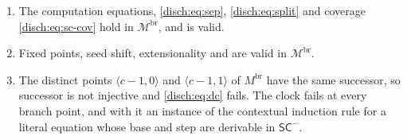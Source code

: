 \begin{lemma}
\label{disch:lem:sc-branch-valid}
\begin{enumerate}[label=\textup{(\alph*)}]
\item The computation equations, \eqref{disch:eq:sep}, \eqref{disch:eq:split}
 and coverage \eqref{disch:eq:sc-cov} hold in $\mathcal M^{\mathrm{br}}$,
 and  is valid.
\item Fixed points, seed shift, extensionality and  are
 valid in $\mathcal M^{\mathrm{br}}$.
\item The distinct points $\langle c-1,0\rangle$ and $\langle c-1,1\rangle$
 of $M^{\mathrm{br}}$ have the same successor, so successor is not injective
 and \eqref{disch:eq:dc} fails. The clock fails at every branch point, and
 with it an instance of the contextual induction rule for a literal equation
 whose base and step are derivable in $\mathsf{SC}^{-}$.
\end{enumerate}
\end{lemma}

